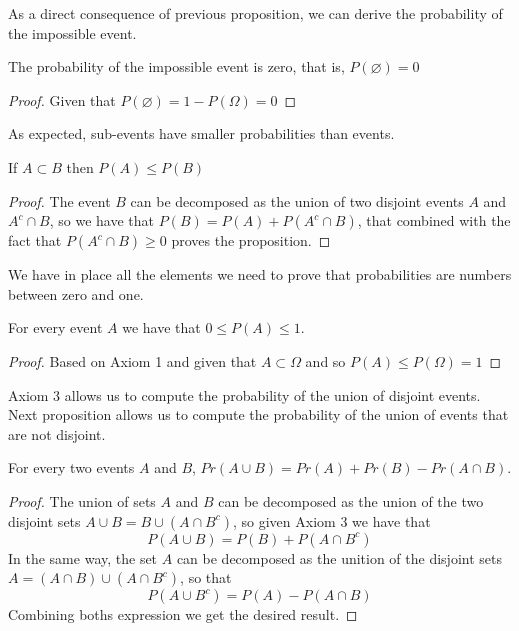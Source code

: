 As a direct consequence of previous proposition, we can derive the probability of the impossible event.

\begin{proposition}
The probability of the impossible event is zero, that is, $P \left( \varnothing \right) = 0$
\end{proposition}
\begin{proof}
Given that $P \left( \varnothing \right) = 1 - P \left( \Omega \right) = 0$
\end{proof}

As expected, sub-events have smaller probabilities than events.

\begin{proposition}
If $A\subset B$ then $P \left( A \right) \leq P \left( B \right)$
\end{proposition}
\begin{proof}
The event $B$ can be decomposed as the union of two disjoint events $A$ and $A^c \cap B$, so we have that $P \left( B \right) = P \left( A \right) + P \left( A^c \cap B \right)$, that combined with the fact that  $P \left( A^c \cap B \right) \geq 0$ proves the proposition.
\end{proof}

We have in place all the elements we need to prove that probabilities are numbers between zero and one.

\begin{proposition}
For every event $A$ we have that $0 \leq P \left( A \right) \leq 1$.
\end{proposition}
\begin{proof}
Based on Axiom 1 and given that $A \subset \Omega$ and so $P \left( A \right) \leq P \left( \Omega \right) = 1$
\end{proof}

Axiom 3 allows us to compute the probability of the union of disjoint events. Next proposition allows us to compute the probability of the union of events that are not disjoint.

\begin{proposition}
For every two events $A$ and $B$, $Pr\left(A\cup B\right)=Pr\left(A\right)+Pr\left(B\right)-Pr\left(A\cap B\right)$.
\end{proposition}
\begin{proof}
The union of sets $A$ and $B$ can be decomposed as the union of the two disjoint sets $A \cup B = B \cup \left( A \cap B^c \right)$, so given Axiom 3 we have that
\[
P \left( A \cup B \right) = P \left( B \right) + P \left( A \cap B^c \right)
\]
In the same way, the set $A$ can be decomposed as the unition of the disjoint sets $A = \left( A \cap B \right) \cup \left( A \cap B^c \right)$, so that
\[
P \left( A \cup B^c \right) = P \left( A \right) - P \left( A \cap B \right)
\]
Combining boths expression we get the desired result.
\end{proof}

